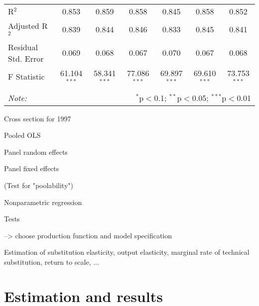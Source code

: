 \documentclass[12pt,a4paper]{article}\usepackage[]{graphicx}\usepackage[]{color}
\begin{document}
\begin{table}[!htbp]
\begin{tabular}{@{\extracolsep{5pt}}lcccccc}
R$^{2}$ & 0.853 & 0.859 & 0.858 & 0.845 & 0.858 & 0.852 \\ 
Adjusted R$^{2}$ & 0.839 & 0.844 & 0.846 & 0.833 & 0.845 & 0.841 \\ 
Residual Std. Error & 0.069 & 0.068 & 0.067 & 0.070 & 0.067 & 0.068 \\ 
F Statistic & 61.104$^{***}$ & 58.341$^{***}$ & 77.086$^{***}$ & 69.897$^{***}$ & 69.610$^{***}$ & 73.753$^{***}$ \\ 
\hline 
\hline \\[-1.8ex] 
\textit{Note:}  & \multicolumn{6}{r}{$^{*}$p$<$0.1; $^{**}$p$<$0.05; $^{***}$p$<$0.01} \\ 
\end{tabular} 
\end{table} 






Cross section for 1997

Pooled OLS

Panel random effects

Panel fixed effects

(Test for "poolability")

Nonparametric regression

Tests

--> choose production function and model specification

Estimation of substitution elasticity, output elasticity, marginal rate of technical substitution, return to scale, ...



\section{Estimation and results}
\end{document}
